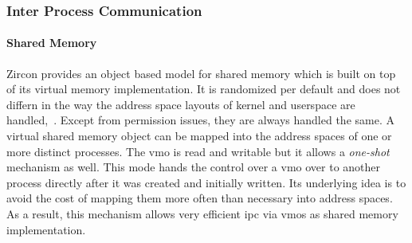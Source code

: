 \subsubsection*{Inter Process Communication}
\paragraph{Shared Memory}
Zircon provides an object based model for shared memory which is built on top of its virtual memory implementation.
It is randomized per default and does not differn in the way the address space layouts of kernel and userspace are handled\cite{zircon-vmo},~\cite{zircon-concepts}.
Except from permission issues, they are always handled the same\cite{zircon-vmar}.
A virtual shared memory object can be mapped into the address spaces of one or more distinct processes.
The \acf{vmo} is read and writable but it allows a \textit{one-shot} mechanism as well.
This mode hands the control over a \ac{vmo} over to another process directly after it was created and initially written\cite{zircon-concepts}.
Its underlying idea is to avoid the cost of mapping them more often than necessary into address spaces.
As a result, this mechanism allows very efficient \ac{ipc} via \acp{vmo} as shared memory implementation\cite{zircon-concepts}.

